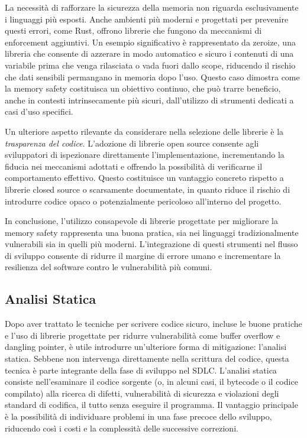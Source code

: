 La necessità di rafforzare la sicurezza della memoria non riguarda esclusivamente
i linguaggi più esposti. Anche ambienti più moderni e progettati per prevenire
questi errori, come Rust, offrono librerie che fungono da meccanismi di
enforcement aggiuntivi. Un esempio significativo è rappresentato da zeroize, una
libreria che consente di azzerare in modo automatico e sicuro i contenuti di una
variabile prima che venga rilasciata o vada fuori dallo scope, riducendo il rischio
che dati sensibili permangano in memoria dopo l'uso. Questo caso dimostra come
la memory safety costituisca un obiettivo continuo, che può trarre beneficio,
anche in contesti intrinsecamente più sicuri, dall'utilizzo di strumenti dedicati
a casi d'uso specifici.

Un ulteriore aspetto rilevante da considerare nella selezione delle librerie è la
\textit{trasparenza del codice}. L'adozione di librerie open source consente agli
sviluppatori di ispezionare direttamente l'implementazione, incrementando la
fiducia nei meccanismi adottati e offrendo la possibilità di verificarne il
comportamento effettivo. Questo costituisce un vantaggio concreto rispetto a librerie
closed source o scarsamente documentate, in quanto riduce il rischio di
introdurre codice opaco o potenzialmente pericoloso all'interno del progetto.

In conclusione, l'utilizzo consapevole di librerie progettate per migliorare la memory
safety rappresenta una buona pratica, sia nei linguaggi tradizionalmente
vulnerabili sia in quelli più moderni. L'integrazione di questi strumenti nel flusso
di sviluppo consente di ridurre il margine di errore umano e incrementare la resilienza
del software contro le vulnerabilità più comuni.

\subsection{Analisi Statica}
\label{sec:analisi-statica}

Dopo aver trattato le tecniche per scrivere codice sicuro, incluse le buone pratiche
e l'uso di librerie progettate per ridurre vulnerabilità come buffer overflow e dangling
pointer, è utile introdurre un'ulteriore forma di mitigazione: l'analisi statica.
Sebbene non intervenga direttamente nella scrittura del codice, questa tecnica è
parte integrante della fase di sviluppo nel SDLC. L'analisi statica consiste
nell'esaminare il codice sorgente (o, in alcuni casi, il bytecode o il codice compilato)
alla ricerca di difetti, vulnerabilità di sicurezza e violazioni degli standard di
codifica, il tutto senza eseguire il programma. Il vantaggio principale è la possibilità
di individuare problemi in una fase precoce dello sviluppo, riducendo così i
costi e la complessità delle successive correzioni.

